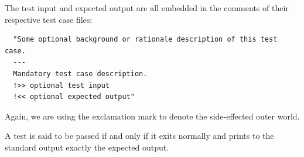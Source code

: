 \documentclass{report}
\begin{document}
The test input and expected output are all embedded in the comments of their respective test case files:

\begin{mdframed}[style=detail]
\begin{verbatim}
  "Some optional background or rationale description of this test case.
  ---
  Mandatory test case description.
  !>> optional test input
  !<< optional expected output"
\end{verbatim}

Again, we are using the exclamation mark to denote the side-effected outer world.
\end{mdframed}

A test is said to be passed if and only if it exits normally and prints to the standard output exactly the expected output.
\end{document}

